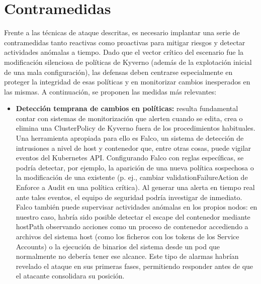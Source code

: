 \documentclass[12pt,twoside,titlepage]{report}
\begin{document}
\section{Contramedidas}
Frente a las técnicas de ataque descritas, es necesario implantar una serie de contramedidas tanto reactivas como proactivas para mitigar riesgos y detectar actividades anómalas a tiempo. Dado que el vector crítico del escenario fue la modificación silenciosa de políticas de Kyverno (además de la explotación inicial de una mala configuración), las defensas deben centrarse especialmente en proteger la integridad de esas políticas y en monitorizar cambios inesperados en las mismas. A continuación, se proponen las medidas más relevantes: 
\begin{itemize}
    \item \textbf{Detección temprana de cambios en políticas:} resulta fundamental contar con sistemas de monitorización que alerten cuando se edita, crea o elimina una ClusterPolicy de Kyverno fuera de los procedimientos habituales. Una herramienta apropiada para ello es Falco, un sistema de detección de intrusiones a nivel de host y contenedor que, entre otras cosas, puede vigilar eventos del Kubernetes API. Configurando Falco con reglas específicas, se podría detectar, por ejemplo, la aparición de una nueva política sospechosa o la modificación de una existente (p. ej., cambiar validationFailureAction de Enforce a Audit en una política crítica). Al generar una alerta en tiempo real ante tales eventos, el equipo de seguridad podría investigar de inmediato. Falco también puede supervisar actividades anómalas en los propios nodos: en nuestro caso, habría sido posible detectar el escape del contenedor mediante hostPath observando acciones como un proceso de contenedor accediendo a archivos del sistema host (como los ficheros con los tokens de los Service Accounts) o la ejecución de binarios del sistema desde un pod que normalmente no debería tener ese alcance. Este tipo de alarmas habrían revelado el ataque en sus primeras fases, permitiendo responder antes de que el atacante consolidara su posición.

\end{itemize}
\end{document}
